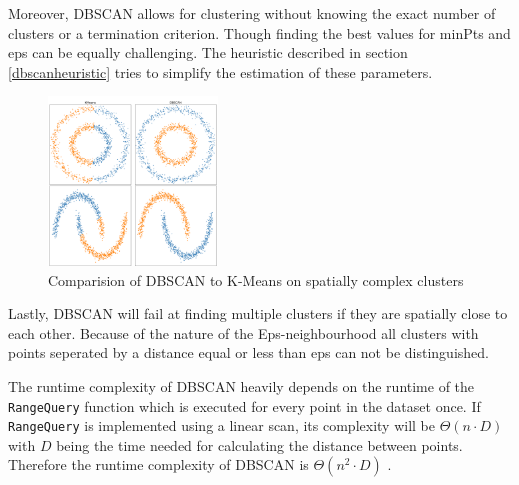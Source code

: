 Moreover, DBSCAN allows for clustering without knowing the exact number of clusters or a termination criterion. Though finding the best values for minPts and eps can be equally challenging. The heuristic described in section \ref{dbscanheuristic} tries to simplify the estimation of these parameters.
\begin{figure}
    \centering
    \includegraphics[width=0.4\textwidth]{../plots/dbscan/dbscan_comp}
    \caption{Comparision of DBSCAN to K-Means on spatially complex clusters}
    \label{fig:dbscanadv}
\end{figure}

Lastly, DBSCAN will fail at finding multiple clusters if they are spatially close to each other. Because of the nature of the Eps-neighbourhood all clusters with points seperated by a distance equal or less than eps can not be distinguished.

The runtime complexity of DBSCAN heavily depends on the runtime of the \texttt{RangeQuery} function which is executed for every point in the dataset once.
If \texttt{RangeQuery} is implemented using a linear scan, its complexity will be $\Theta (n \cdot D)$ with $D$ being the time needed for calculating the distance between points. Therefore the runtime complexity of DBSCAN is $\Theta(n^2 \cdot D)$ \cite{dbscanrevisited}.